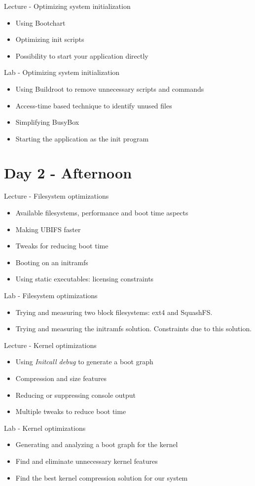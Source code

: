 \documentclass[a4paper,12pt,obeyspaces,spaces,hyphens]{article}
\begin{document}
\feagendatwocolumn
{Lecture - Optimizing system initialization}
{
  \begin{itemize}
  \item Using Bootchart
  \item Optimizing init scripts
  \item Possibility to start your application directly
  \end{itemize}
}
{Lab - Optimizing system initialization}
{
 \begin{itemize}
 \item Using Buildroot to remove unnecessary scripts and commands
 \item Access-time based technique to identify  unused files
 \item Simplifying BusyBox
 \item Starting the application as the init program
 \end{itemize}
}

\section{Day 2 - Afternoon}

\feagendatwocolumn
{Lecture - Filesystem optimizations}
{
  \begin{itemize}
  \item Available filesystems, performance and boot time aspects
  \item Making UBIFS faster
  \item Tweaks for reducing boot time
  \item Booting on an initramfs
  \item Using static executables: licensing constraints
  \end{itemize}
}
{Lab - Filesystem optimizations}
{
 \begin{itemize}
 \item Trying and measuring two block filesystems: ext4 and SquashFS.
 \item Trying and measuring the initramfs solution. Constraints
       due to this solution.
 \end{itemize}
}

\feagendatwocolumn
{Lecture - Kernel optimizations}
{
  \begin{itemize}
  \item Using {\em Initcall debug} to generate a boot graph
  \item Compression and size features
  \item Reducing or suppressing console output
  \item Multiple tweaks to reduce boot time
  \end{itemize}
}
{Lab - Kernel optimizations}
{
 \begin{itemize}
 \item Generating and analyzing a boot graph for the kernel
 \item Find and eliminate unnecessary kernel features
 \item Find the best kernel compression solution for our system
 \end{itemize}
}
\end{document}
